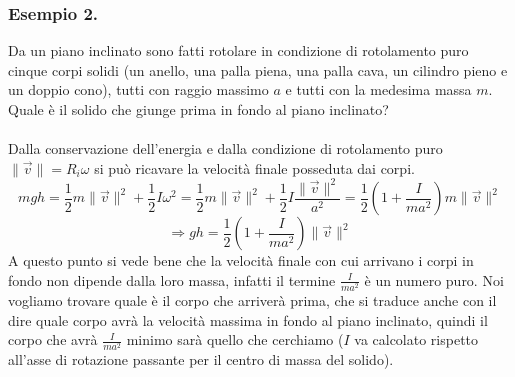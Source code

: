 \documentclass[10pt]{article}
\theoremstyle{plain}
\theoremstyle{definition}
\begin{document}
\subsubsection{Esempio 2.}
Da un piano inclinato sono fatti rotolare in condizione di rotolamento puro cinque corpi solidi (un anello, una palla piena, una palla cava, un cilindro pieno e un doppio cono), tutti con raggio massimo $a$ e tutti con la medesima massa $m$. Quale è il solido che giunge prima in fondo al piano inclinato?\\ 
\\
Dalla conservazione dell'energia e dalla condizione di rotolamento puro $\lVert \vec{v} \rVert = R_i \omega$ si può ricavare la velocità finale posseduta dai corpi.
$$mgh = \frac{1}{2}m \lVert \vec{v} \rVert^2 + \frac{1}{2} I \omega^2 = \frac{1}{2}m \lVert \vec{v} \rVert^2 + \frac{1}{2} I \frac{\lVert \vec{v} \rVert^2}{a^2} = \frac{1}{2} \left( 1+\frac{I}{ma^2}\right)m\lVert \vec{v} \rVert^2$$
$$\Rightarrow gh = \frac{1}{2} \left( 1+\frac{I}{ma^2}\right)\lVert \vec{v} \rVert^2$$
A questo punto si vede bene che la velocità finale con cui arrivano i corpi in fondo non dipende dalla loro massa, infatti il termine $\frac{I}{ma^2}$ è un numero puro. Noi vogliamo trovare quale è il corpo che arriverà prima, che si traduce anche con il dire quale corpo avrà la velocità massima in fondo al piano inclinato, quindi il corpo che avrà $\frac{I}{ma^2}$ minimo sarà quello che cerchiamo ($I$ va calcolato rispetto all'asse di rotazione passante per il centro di massa del solido).
\end{document}
